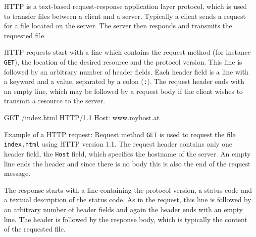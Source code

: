 




HTTP is a text-based request-response application layer protocol,
which is used to transfer files between a client and a server.
Typically a client sends a request for a file located on the server.
The server then responds and transmits the requested file.

HTTP requests start with a line which contains
the request method (for instance \verb|GET|),
the location of the desired resource and the protocol version.
This line is followed by an arbitrary number of header fields.
Each header field is a line with a keyword and a value,
separated by a colon (\verb|:|).
The request header ends with an empty line,
which may be followed by a request body
if the client wishes to transmit a resource to the server.

\begin{center}
\begin{minipage}{8cm}
\begin{osuefmtcode}
GET /index.html HTTP/1.1
Host: www.myhost.at
\end{osuefmtcode}
\end{minipage}
\begin{minipage}{12cm}
\vspace{3mm}
\footnotesize{Example of a HTTP request:
Request method \verb|GET| is used to request the file \verb|index.html|
using HTTP version 1.1.
The request header contains only one header field,
the \verb|Host| field, which specifies the hostname of the server.
An empty line ends the header
and since there is no body this is also the end of the request message.}
\end{minipage}
\end{center}

The response starts with a line containing the protocol version,
a status code and a textual description of the status code.
As in the request,
this line is followed by an arbitrary number of header fields
and again the header ends with an empty line.
The header is followed by the response body,
which is typically the content of the requested file.

